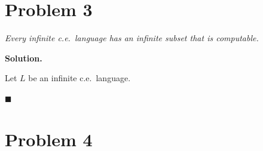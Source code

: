 \documentclass[11pt]{article}
\newenvironment{solution}{%
  \par\noindent\textbf{Solution.}\ \normalfont
}{\hfill$\blacksquare$\par\medskip}
\theoremstyle{plain}
\theoremstyle{definition}
\begin{document}
\newpage
\section*{Problem 3}
\noindent\emph{Every infinite c.e.\ language has an infinite subset that is computable.}

\begin{solution}
Let $L$ be an infinite c.e.\ language.

\end{solution}

\newpage
\section*{Problem 4}
\end{document}
